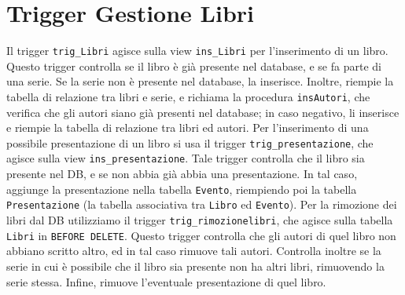\section{Trigger Gestione Libri}
Il trigger \texttt{trig\_Libri} agisce sulla view \texttt{ins\_Libri} per l'inserimento di un libro.
Questo trigger controlla se il libro è già presente nel database, e se fa parte di una serie. Se la 
serie non è presente nel database, la inserisce. Inoltre, riempie la tabella di relazione tra libri e serie, 
e richiama la procedura \texttt{insAutori}, che verifica che gli autori siano già presenti nel database; in 
caso negativo, li inserisce e riempie la tabella di relazione tra libri ed autori.
Per l'inserimento di una possibile presentazione di un libro si usa il trigger \texttt{trig\_presentazione}, 
che agisce sulla view \texttt{ins\_presentazione}. Tale trigger controlla che il libro sia presente nel DB, 
e se non abbia già abbia una presentazione. In tal caso, aggiunge la presentazione nella tabella \texttt{Evento}, 
riempiendo poi la tabella \texttt{Presentazione} (la tabella associativa tra \texttt{Libro} ed \texttt{Evento}).
Per la rimozione dei libri dal DB utilizziamo il trigger \texttt{trig\_rimozionelibri}, che agisce sulla tabella 
\texttt{Libri} in \texttt{BEFORE DELETE}. Questo trigger controlla che gli autori di quel libro non abbiano scritto 
altro, ed in tal caso rimuove tali autori. Controlla inoltre se la serie in cui è possibile che il libro sia presente 
non ha altri libri, rimuovendo la serie stessa. Infine, rimuove l'eventuale presentazione di quel libro.

